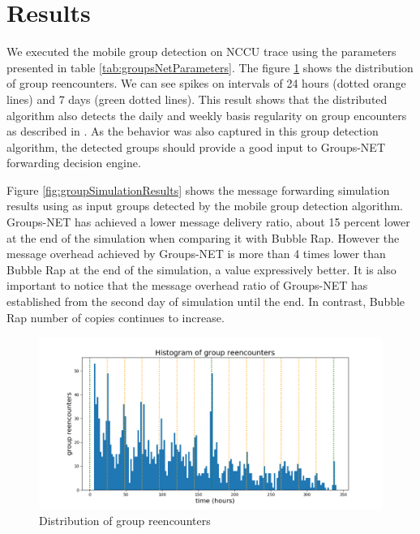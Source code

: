 \section{Results}
\label{sec:GNResults}

We executed the mobile group detection on NCCU trace using the parameters presented in table \ref{tab:groupsNetParameters}. The figure \ref{fig:groupReencounters} shows the distribution of group reencounters. We can see spikes on intervals of 24 hours (dotted orange lines) and 7 days (green dotted lines). This result shows that the distributed algorithm also detects the daily and weekly basis regularity on group encounters as described in \citep{groupMobility}. As the behavior was also captured in this group detection algorithm, the detected groups should provide a good input to Groups-NET forwarding decision engine.

Figure \ref{fig:groupSimulationResults} shows the message forwarding simulation results using as input groups detected by the mobile group detection algorithm. Groups-NET has achieved a lower message delivery ratio, about 15 percent lower at the end of the simulation when comparing it with Bubble Rap. However the message overhead achieved by Groups-NET is more than 4 times lower than Bubble Rap at the end of the simulation, a value expressively better. It is also important to notice that the message overhead ratio of Groups-NET has established from the second day of simulation until the end. In contrast, Bubble Rap number of copies continues to increase.

\begin{figure}
	\includegraphics[width=\linewidth]{imgs/groups-net/group-reencounters.png}
    \caption{Distribution of group reencounters}
    \label{fig:groupReencounters}
\end{figure}


